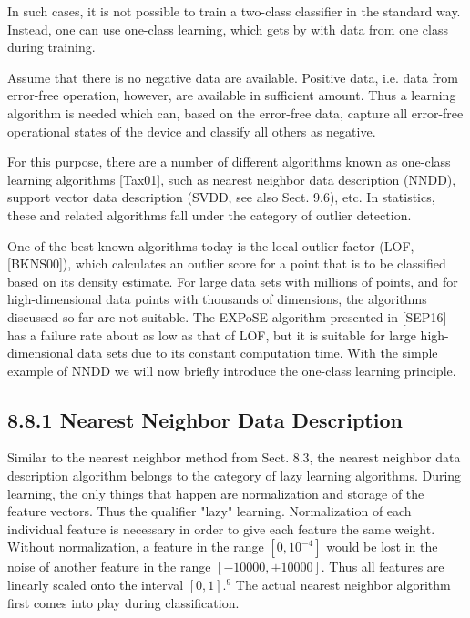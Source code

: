 \documentclass[10pt]{article}
\begin{document}
In such cases, it is not possible to train a two-class classifier in the standard way. Instead, one can use one-class learning, which gets by with data from one class during training.

Assume that there is no negative data are available. Positive data, i.e. data from error-free operation, however, are available in sufficient amount. Thus a learning algorithm is needed which can, based on the error-free data, capture all error-free operational states of the device and classify all others as negative.

For this purpose, there are a number of different algorithms known as one-class learning algorithms [Tax01], such as nearest neighbor data description (NNDD), support vector data description (SVDD, see also Sect. 9.6), etc. In statistics, these and related algorithms fall under the category of outlier detection.

One of the best known algorithms today is the local outlier factor (LOF, [BKNS00]), which calculates an outlier score for a point that is to be classified based on its density estimate. For large data sets with millions of points, and for high-dimensional data points with thousands of dimensions, the algorithms discussed so far are not suitable. The EXPoSE algorithm presented in [SEP16] has a failure rate about as low as that of LOF, but it is suitable for large high-dimensional data sets due to its constant computation time. With the simple example of NNDD we will now briefly introduce the one-class learning principle.

\subsection*{8.8.1 Nearest Neighbor Data Description}
Similar to the nearest neighbor method from Sect. 8.3, the nearest neighbor data description algorithm belongs to the category of lazy learning algorithms. During learning, the only things that happen are normalization and storage of the feature vectors. Thus the qualifier "lazy" learning. Normalization of each individual feature is necessary in order to give each feature the same weight. Without normalization, a feature in the range $\left[0,10^{-4}\right]$ would be lost in the noise of another feature in the range $[-10000,+10000]$. Thus all features are linearly scaled onto the interval $[0,1] .^{9}$ The actual nearest neighbor algorithm first comes into play during classification.
\end{document}

